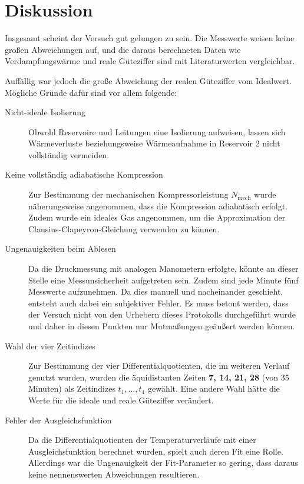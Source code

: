 \section{Diskussion}
Insgesamt scheint der Versuch gut gelungen zu sein.
Die Messwerte weisen keine großen Abweichungen auf,
und die daraus berechneten Daten wie Verdampfungswärme und reale Güteziffer sind mit Literaturwerten vergleichbar.

Auffällig war jedoch die große Abweichung der realen Güteziffer vom Idealwert. Mögliche Gründe dafür sind vor allem folgende:
\begin{description}
  \item[Nicht-ideale Isolierung]
  Obwohl Reservoire und Leitungen eine Isolierung aufweisen,
  lassen sich Wärmeverluste beziehungsweise Wärmeaufnahme in Reservoir 2 nicht vollständig vermeiden.

  \item[Keine vollständig adiabatische Kompression]
  Zur Bestimmung der mechanischen Kompressorleistung $N_\text{mech}$ wurde näherungsweise angenommen,
  dass die Kompression adiabatisch erfolgt.
  Zudem wurde ein ideales Gas angenommen,
  um die Approximation der Clausius-Clapeyron-Gleichung verwenden zu können.

  \item[Ungenauigkeiten beim Ablesen]
  Da die Druckmessung mit analogen Manometern erfolgte,
  könnte an dieser Stelle eine Messunsicherheit aufgetreten sein.
  Zudem sind jede Minute fünf Messwerte aufzunehmen.
  Da dies manuell und nacheinander geschieht,
  entsteht auch dabei ein subjektiver Fehler.
  Es muss betont werden,
  dass der Versuch nicht von den Urhebern dieses Protokolls durchgeführt wurde
  und daher in diesen Punkten nur Mutmaßungen geäußert werden können.

  \item[Wahl der vier Zeitindizes] Zur Bestimmung der vier Differentialquotienten,
  die im weiteren Verlauf genutzt wurden,
  wurden die äquidistanten Zeiten \textbf{7, 14, 21, 28} (von 35 Minuten) als Zeitindizes $t_1, \ldots, t_4$ gewählt.
  Eine andere Wahl hätte die Werte für die ideale und reale Güteziffer verändert.

  \item[Fehler der Ausgleichsfunktion]
  Da die Differentialquotienten der Temperaturverläufe mit einer Ausgleichsfunktion berechnet wurden, spielt auch deren Fit eine Rolle. Allerdings war die Ungenauigkeit der Fit-Parameter so gering, dass daraus keine nennenswerten Abweichungen resultieren.
\end{description}
